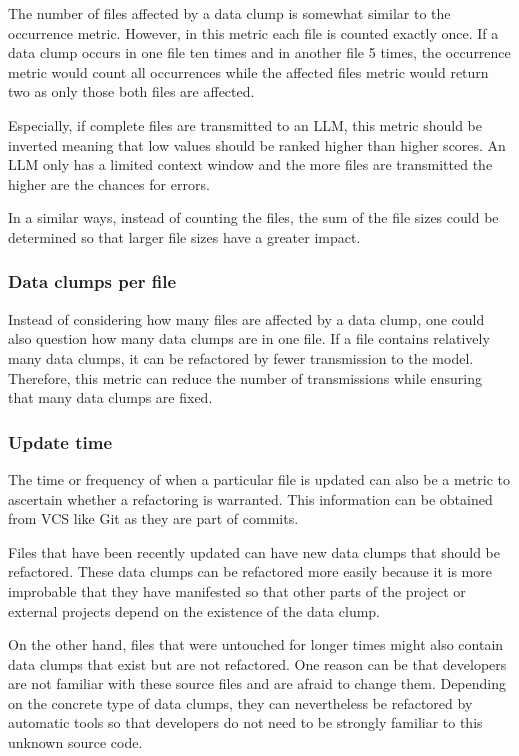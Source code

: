 The number of files affected by a data clump is somewhat  similar to the occurrence metric. However, in this metric each file is counted exactly once. If a data clump occurs in one file ten times and in another file 5 times, the occurrence metric would count all occurrences while the affected files metric would return two as only those both files are affected. 

Especially, if complete files are transmitted to an \ac{LLM}, this metric should be inverted meaning that low values should be ranked higher than higher scores. An \ac{LLM} only has a limited context window and the more files are transmitted the higher are the chances for errors.  

In a similar ways, instead of counting the files, the sum of the file sizes could be determined so that larger file sizes have a greater impact.

\subsubsection{Data clumps per file}

Instead of considering how many files are affected by a data clump, one could also question how many data clumps are in one file. If a file contains relatively many data clumps, it can be refactored by fewer transmission to the model. Therefore, this metric can reduce the number of transmissions while ensuring that many data clumps are fixed. 

\subsubsection{Update time}

The time or frequency of when a particular file is updated can also be a metric to ascertain whether a refactoring is warranted. This information can be obtained from \ac{VCS} like Git as they are part of commits.

Files that have been recently updated can have new data clumps that should be refactored. These data clumps can be refactored more easily because it is more improbable that they have manifested so that other parts of the project or external projects depend on the existence of the data clump. 

On the other hand, files that were untouched for longer times might also contain data clumps that exist but are not refactored. One reason can be that developers are not familiar with these source files and are afraid to change them. Depending on the concrete type of data clumps, they can nevertheless be refactored by automatic tools so that developers do not need to be strongly familiar to this unknown source code. 


